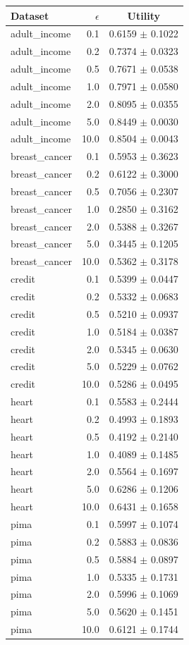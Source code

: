 \begin{tabular}{lrc}
\toprule
Dataset & $\epsilon$ & Utility \\
\midrule
adult_income & 0.1 & 0.6159 $\pm$ 0.1022 \\
adult_income & 0.2 & 0.7374 $\pm$ 0.0323 \\
adult_income & 0.5 & 0.7671 $\pm$ 0.0538 \\
adult_income & 1.0 & 0.7971 $\pm$ 0.0580 \\
adult_income & 2.0 & 0.8095 $\pm$ 0.0355 \\
adult_income & 5.0 & 0.8449 $\pm$ 0.0030 \\
adult_income & 10.0 & 0.8504 $\pm$ 0.0043 \\
breast_cancer & 0.1 & 0.5953 $\pm$ 0.3623 \\
breast_cancer & 0.2 & 0.6122 $\pm$ 0.3000 \\
breast_cancer & 0.5 & 0.7056 $\pm$ 0.2307 \\
breast_cancer & 1.0 & 0.2850 $\pm$ 0.3162 \\
breast_cancer & 2.0 & 0.5388 $\pm$ 0.3267 \\
breast_cancer & 5.0 & 0.3445 $\pm$ 0.1205 \\
breast_cancer & 10.0 & 0.5362 $\pm$ 0.3178 \\
credit & 0.1 & 0.5399 $\pm$ 0.0447 \\
credit & 0.2 & 0.5332 $\pm$ 0.0683 \\
credit & 0.5 & 0.5210 $\pm$ 0.0937 \\
credit & 1.0 & 0.5184 $\pm$ 0.0387 \\
credit & 2.0 & 0.5345 $\pm$ 0.0630 \\
credit & 5.0 & 0.5229 $\pm$ 0.0762 \\
credit & 10.0 & 0.5286 $\pm$ 0.0495 \\
heart & 0.1 & 0.5583 $\pm$ 0.2444 \\
heart & 0.2 & 0.4993 $\pm$ 0.1893 \\
heart & 0.5 & 0.4192 $\pm$ 0.2140 \\
heart & 1.0 & 0.4089 $\pm$ 0.1485 \\
heart & 2.0 & 0.5564 $\pm$ 0.1697 \\
heart & 5.0 & 0.6286 $\pm$ 0.1206 \\
heart & 10.0 & 0.6431 $\pm$ 0.1658 \\
pima & 0.1 & 0.5997 $\pm$ 0.1074 \\
pima & 0.2 & 0.5883 $\pm$ 0.0836 \\
pima & 0.5 & 0.5884 $\pm$ 0.0897 \\
pima & 1.0 & 0.5335 $\pm$ 0.1731 \\
pima & 2.0 & 0.5996 $\pm$ 0.1069 \\
pima & 5.0 & 0.5620 $\pm$ 0.1451 \\
pima & 10.0 & 0.6121 $\pm$ 0.1744 \\
\bottomrule
\end{tabular}